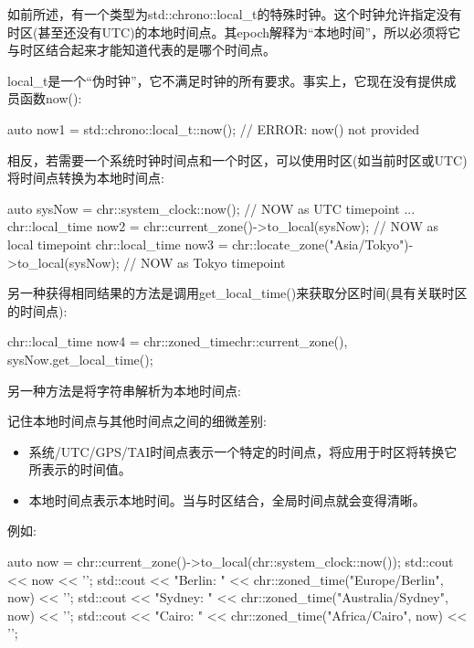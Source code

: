 如前所述，有一个类型为std::chrono::local\_t的特殊时钟。这个时钟允许指定没有时区(甚至还没有UTC)的本地时间点。其epoch解释为“本地时间”，所以必须将它与时区结合起来才能知道代表的是哪个时间点。

local\_t是一个“伪时钟”，它不满足时钟的所有要求。事实上，它现在没有提供成员函数now():

\begin{cpp}
auto now1 = std::chrono::local_t::now(); // ERROR: now() not provided
\end{cpp}

相反，若需要一个系统时钟时间点和一个时区，可以使用时区(如当前时区或UTC)将时间点转换为本地时间点:

\begin{cpp}
auto sysNow = chr::system_clock::now(); // NOW as UTC timepoint
...
chr::local_time now2
	= chr::current_zone()->to_local(sysNow); // NOW as local timepoint
chr::local_time now3
	= chr::locate_zone("Asia/Tokyo")->to_local(sysNow); // NOW as Tokyo timepoint
\end{cpp}

另一种获得相同结果的方法是调用get\_local\_time()来获取分区时间(具有关联时区的时间点):

\begin{cpp}
chr::local_time now4 = chr::zoned_time{chr::current_zone(),
										sysNow}.get_local_time();
\end{cpp}

另一种方法是将字符串解析为本地时间点:


记住本地时间点与其他时间点之间的细微差别:

\begin{itemize}
\item
系统/UTC/GPS/TAI时间点表示一个特定的时间点，将应用于时区将转换它所表示的时间值。

\item
本地时间点表示本地时间。当与时区结合，全局时间点就会变得清晰。
\end{itemize}

例如:

\begin{cpp}
auto now = chr::current_zone()->to_local(chr::system_clock::now());
std::cout << now << '\n';
std::cout << "Berlin: " << chr::zoned_time("Europe/Berlin", now) << '\n';
std::cout << "Sydney: " << chr::zoned_time("Australia/Sydney", now) << '\n';
std::cout << "Cairo: " << chr::zoned_time("Africa/Cairo", now) << '\n';
\end{cpp}

